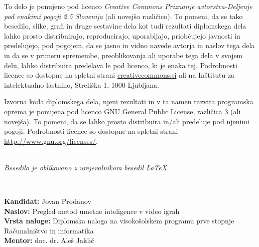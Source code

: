 \documentclass[a4paper,12pt,openright]{book}
\newcommand{\ttitle}{Pregled metod umetne inteligence v video igrah}
\newcommand{\tauthor}{Jovan Prodanov}
\newcommand{\clearemptydoublepage}{\newpage{\pagestyle{empty}\cleardoublepage}}
\begin{document}
\newpage
\thispagestyle{empty}

\vspace*{5cm}
{\small \noindent
To delo je ponujeno pod licenco \textit{Creative Commons Priznanje avtorstva-Deljenje pod enakimi pogoji 2.5 Slovenija} (ali novej\v so razli\v cico).
To pomeni, da se tako besedilo, slike, grafi in druge sestavine dela kot tudi rezultati diplomskega dela lahko prosto distribuirajo,
reproducirajo, uporabljajo, priobčujejo javnosti in predelujejo, pod pogojem, da se jasno in vidno navede avtorja in naslov tega
dela in da se v primeru spremembe, preoblikovanja ali uporabe tega dela v svojem delu, lahko distribuira predelava le pod
licenco, ki je enaka tej.
Podrobnosti licence so dostopne na spletni strani \href{http://creativecommons.si}{creativecommons.si} ali na Inštitutu za
intelektualno lastnino, Streliška 1, 1000 Ljubljana.

\vspace*{1cm}
\begin{center}%
\hspace*{1ex}\hspace*{1ex}%
\end{center}
}

\vspace*{1cm}
{\small \noindent
Izvorna koda diplomskega dela, njeni rezultati in v ta namen razvita programska oprema je ponujena pod licenco GNU General Public License,
različica 3 (ali novejša). To pomeni, da se lahko prosto distribuira in/ali predeluje pod njenimi pogoji.
Podrobnosti licence so dostopne na spletni strani \url{http://www.gnu.org/licenses/}.
}

\vfill
\begin{center} 
\ \\ \vfill
{\em
Besedilo je oblikovano z urejevalnikom besedil \LaTeX.}
\end{center}

\clearemptydoublepage

\thispagestyle{empty}
\
\vfill

\bigskip
\noindent\textbf{Kandidat:} \tauthor\\
\noindent\textbf{Naslov:} \ttitle\\
\noindent\textbf{Vrsta naloge:} Diplomska naloga na visokošolskem programu prve stopnje Računalništvo in informatika \\
\noindent\textbf{Mentor:} doc. dr. Aleš Jaklič\\
\end{document}
